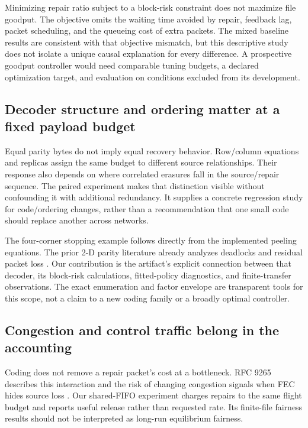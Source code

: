 \documentclass[11pt,a4paper]{article}
\begin{document}
Minimizing repair ratio subject to a block-risk constraint does not maximize file goodput. The objective omits the waiting time avoided by repair, feedback lag, packet scheduling, and the queueing cost of extra packets. The mixed baseline results are consistent with that objective mismatch, but this descriptive study does not isolate a unique causal explanation for every difference. A prospective goodput controller would need comparable tuning budgets, a declared optimization target, and evaluation on conditions excluded from its development.

\subsection{Decoder structure and ordering matter at a fixed payload budget}
Equal parity bytes do not imply equal recovery behavior. Row/column equations and replicas assign the same budget to different source relationships. Their response also depends on where correlated erasures fall in the source/repair sequence. The paired experiment makes that distinction visible without confounding it with additional redundancy. It supplies a concrete regression study for code/ordering changes, rather than a recommendation that one small code should replace another across networks.

The four-corner stopping example follows directly from the implemented peeling equations. The prior 2-D parity literature already analyzes deadlocks and residual packet loss \cite{golaghazadeh2022parity}. Our contribution is the artifact's explicit connection between that decoder, its block-risk calculations, fitted-policy diagnostics, and finite-transfer observations. The exact enumeration and factor envelope are transparent tools for this scope, not a claim to a new coding family or a broadly optimal controller.

\subsection{Congestion and control traffic belong in the accounting}
Coding does not remove a repair packet's cost at a bottleneck. RFC 9265 describes this interaction and the risk of changing congestion signals when FEC hides source loss \cite{kuhn2022congestion}. Our shared-FIFO experiment charges repairs to the same flight budget and reports useful release rather than requested rate. Its finite-file fairness results should not be interpreted as long-run equilibrium fairness.
\end{document}

